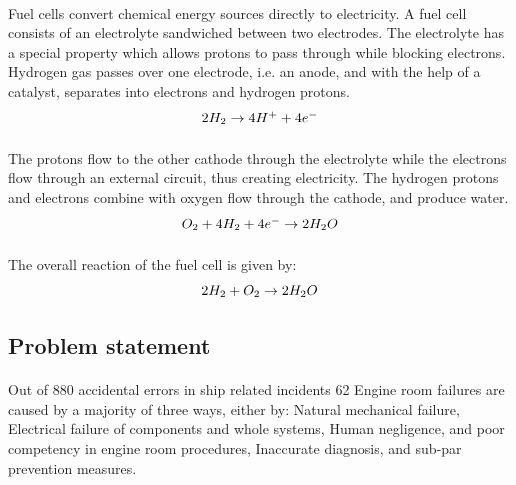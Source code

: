 \paragraph{}Fuel cells convert chemical energy sources directly to electricity. A fuel cell consists of an electrolyte sandwiched between two electrodes. The electrolyte has a special property which allows protons to pass through while blocking electrons. Hydrogen gas passes over one electrode, i.e. an anode, and with the help of a catalyst, separates into electrons and hydrogen protons.
\begin{equation}
$$2H_{2}\rightarrow 4H^{+} + 4e^{-}$$
\end{equation}
\paragraph{}The protons ﬂow to the other cathode through the electrolyte while the electrons ﬂow through an external circuit, thus creating electricity. The hydrogen protons and electrons combine with oxygen ﬂow through the cathode, and produce water.
\begin{equation}
$$O_{2}+ 4H_{2} + 4e^{-} \rightarrow 2H_{2}O $$
\end{equation}
\paragraph{}The overall reaction of the fuel cell is given by:
\begin{equation}
$$2H_{2}+ O_{2} \rightarrow 2H_{2}O $$
\end{equation}

\subsection{Problem statement}
\paragraph{} Out of 880 accidental errors in ship related incidents 62%
Engine room failures are caused by a majority of three ways, either by:  Natural mechanical failure, Electrical failure of components and whole systems, Human negligence, and poor competency in engine room procedures, Inaccurate diagnosis, and sub-par prevention measures.
